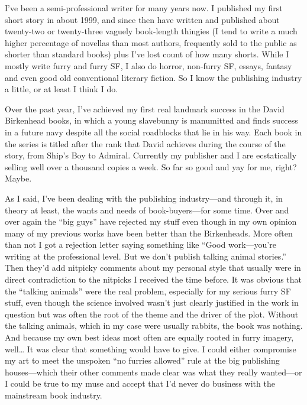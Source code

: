 
I've been a semi-professional writer for many years now. I published my first short story in about 1999, and since then have written and published about twenty-two or twenty-three vaguely book-length thingies (I tend to write a much higher percentage of novellas than most authors, frequently sold to the public as shorter than standard books) plus I've lost count of how many shorts. While I mostly write furry and furry SF, I also do horror, non-furry SF, essays, fantasy and even good old conventional literary fiction. So I know the publishing industry a little, or at least I think I do.

Over the past year, I've achieved my first real landmark success in the David Birkenhead books, in which a young slavebunny is manumitted and finds success in a future navy despite all the social roadblocks that lie in his way. Each book in the series is titled after the rank that David achieves during the course of the story, from Ship's Boy to Admiral. Currently my publisher and I are ecstatically selling well over a thousand copies a week. So far so good and yay for me, right? Maybe.

As I said, I've been dealing with the publishing industry—and through it, in theory at least, the wants and needs of book-buyers—for some time. Over and over again the ``big guys'' have rejected my stuff even though in my own opinion many of my previous works have been better than the Birkenheads. More often than not I got a rejection letter saying something like ``Good work—you're writing at the professional level. But we don't publish talking animal stories.'' Then they'd add nitpicky comments about my personal style that usually were in direct contradiction to the nitpicks I received the time before. It was obvious that the ``talking animals'' were the real problem, especially for my serious furry SF stuff, even though the science involved wasn't just clearly justified in the work in question but was often the root of the theme and the driver of the plot. Without the talking animals, which in my case were usually rabbits, the book was nothing. And because my own best ideas most often are equally rooted in furry imagery, well… It was clear that something would have to give. I could either compromise my art to meet the unspoken ``no furries allowed'' rule at the big publishing houses—which their other comments made clear was what they really wanted—or I could be true to my muse and accept that I'd never do business with the mainstream book industry.

